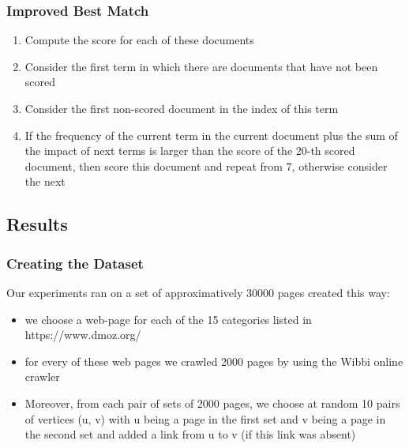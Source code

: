 \documentclass{beamer}
\begin{document}
\begin{frame}
\frametitle{Improved Best Match}
\begin{enumerate}	
	\suite
	\item Compute the score for each of these documents
	\item Consider the first term in which there are documents that have not been scored
	\item Consider the first non-scored document in the index of this term
	\item If the frequency of the current term in the current document plus the sum of the impact of next terms is larger than the score of the 20-th scored document, then score this document and repeat from 7, otherwise consider the next    
\end{enumerate}
\end{frame}

\subsection{Results}
\begin{frame}
\frametitle{Creating the Dataset}
Our experiments ran on a set of approximatively 30000 pages created this way:
\begin{itemize}
	\item we choose a web-page for each of the 15 categories listed in https://www.dmoz.org/
	\item for every of these web pages we crawled 2000 pages by using the Wibbi online crawler
	\item Moreover, from each pair of sets of 2000 pages, we choose at random 10 pairs of vertices (u, v) with u being a page in the first set and v being a page in the second set and added a link from u to v (if this link was absent)
\end{itemize}
\end{frame}
\end{document}
